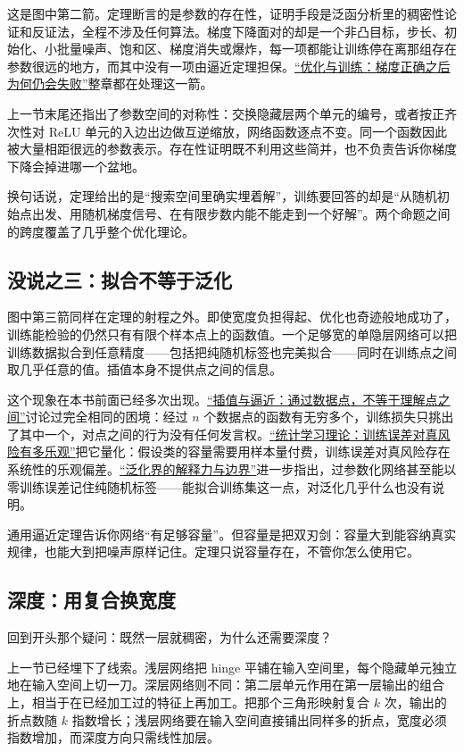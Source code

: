 这是图中第二箭。定理断言的是参数的存在性，证明手段是泛函分析里的稠密性论证和反证法，全程不涉及任何算法。梯度下降面对的却是一个非凸目标，步长、初始化、小批量噪声、饱和区、梯度消失或爆炸，每一项都能让训练停在离那组存在参数很远的地方，而其中没有一项由逼近定理担保。\hyperref[ch:125]{``优化与训练：梯度正确之后为何仍会失败''}整章都在处理这一箭。

上一节末尾还指出了参数空间的对称性：交换隐藏层两个单元的编号，或者按正齐次性对 ReLU 单元的入边出边做互逆缩放，网络函数逐点不变。同一个函数因此被大量相距很远的参数表示。存在性证明既不利用这些简并，也不负责告诉你梯度下降会掉进哪一个盆地。

换句话说，定理给出的是``搜索空间里确实埋着解''，训练要回答的却是``从随机初始点出发、用随机梯度信号、在有限步数内能不能走到一个好解''。两个命题之间的跨度覆盖了几乎整个优化理论。

\subsection{没说之三：拟合不等于泛化}

图中第三箭同样在定理的射程之外。即使宽度负担得起、优化也奇迹般地成功了，训练能检验的仍然只有有限个样本点上的函数值。一个足够宽的单隐层网络可以把训练数据拟合到任意精度——包括把纯随机标签也完美拟合——同时在训练点之间取几乎任意的值。插值本身不提供点之间的信息。

这个现象在本书前面已经多次出现。\hyperref[ch:063]{``插值与逼近：通过数据点，不等于理解点之间''}讨论过完全相同的困境：经过 \(n\) 个数据点的函数有无穷多个，训练损失只挑出了其中一个，对点之间的行为没有任何发言权。\hyperref[ch:118]{``统计学习理论：训练误差对真风险有多乐观''}把它量化：假设类的容量需要用样本量付费，训练误差对真风险存在系统性的乐观偏差。\hyperref[sec:13-Machine-Learning/10-Learning-Theory/04]{``泛化界的解释力与边界''}进一步指出，过参数化网络甚至能以零训练误差记住纯随机标签——能拟合训练集这一点，对泛化几乎什么也没有说明。

通用逼近定理告诉你网络``有足够容量''。但容量是把双刃剑：容量大到能容纳真实规律，也能大到把噪声原样记住。定理只说容量存在，不管你怎么使用它。

\subsection{深度：用复合换宽度}

回到开头那个疑问：既然一层就稠密，为什么还需要深度？

上一节已经埋下了线索。浅层网络把 hinge 平铺在输入空间里，每个隐藏单元独立地在输入空间上切一刀。深层网络则不同：第二层单元作用在第一层输出的组合上，相当于在已经加工过的特征上再加工。把那个三角形映射复合 \(k\) 次，输出的折点数随 \(k\) 指数增长；浅层网络要在输入空间直接铺出同样多的折点，宽度必须指数增加，而深度方向只需线性加层。

